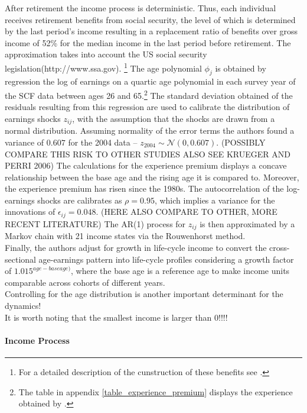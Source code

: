 \documentclass[a4paper,12pt,legno]{article}
\begin{document}
After retirement the income process is deterministic. Thus, each individual receives retirement benefits from social security, the level of which is determined by the last period's income resulting in a replacement ratio of benefits over gross income of 52\% for the median income in the last period before retirement. The approximation takes into account the US social security legislation(http://www.ssa.gov). \footnote{For a detailed description of the cunstruction of these benefits see \cite{hintermaier2011}.} The age polynomial $\phi_{j}$ is obtained by  regression the log of earnings on a quartic age polynomial in each survey year of the SCF data between ages 26 and 65.\footnote{The table in appendix \ref{table_experience_premium} displays the experience obtained by \cite{hintermaier2011}.} The standard deviation obtained of the residuals resulting from this regression are used to calibrate the distribution of earnings shocks $z_{ij}$, with the assumption that the shocks are drawn from a normal distribution. Assuming normality of the error terms the authors found a variance of $0.607$ for the 2004 data \---  $z_{2004} \sim \mathcal{N}(0,0.607)$. (POSSIBLY COMPARE THIS RISK TO OTHER STUDIES ALSO SEE KRUEGER AND PERRI 2006) The calculations for the experience premium displays a concave relationship between the base age and the rising age it is compared to. Moreover, the experience premium has risen since the 1980s. The autocorrelation of the log-earnings shocks are calibrates as $\rho = 0.95$, which implies a variance for the innovations of $\epsilon_{ij} = 0.048$. (HERE ALSO COMPARE TO OTHER, MORE RECENT LITERATURE) The AR(1) process for $z_{ij}$ is then approximated by a Markov chain with 21 income states via the Rouwenhorst method.\\

Finally, the authors adjust for growth in life-cycle income to convert the cross-sectional age-earnings pattern into life-cycle profiles considering a growth factor of $1.015^{age-base age)}$, where the base age is a reference age to make income units comparable across cohorts of different years. \\

Controlling for the age distribution is another important determinant for the dynamics! \\

It is worth noting that the smallest income is larger than 0!!!! 

\paragraph{Income Process}
\end{document}
